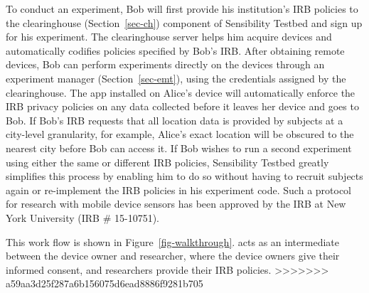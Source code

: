 To conduct an experiment, Bob will first provide his institution's 
IRB policies to the clearinghouse (Section~\ref{sec-ch}) component of Sensibility Testbed 
and sign up for his experiment. 
The clearinghouse server helps him acquire devices and automatically codifies 
policies specified by Bob's IRB. After obtaining remote devices, 
Bob can perform experiments directly on the devices through 
an experiment manager (Section~\ref{sec-emt}), using the 
credentials assigned by the clearinghouse. The app installed on Alice's device will 
automatically enforce the IRB privacy policies on any data collected before it leaves her device and 
goes to Bob. If Bob's IRB requests that all location data is provided by subjects at 
a city-level granularity, for example, Alice's exact location will be obscured 
to the nearest city before Bob can access it. 
If Bob wishes to run a
second experiment using either the same or different IRB policies, Sensibility Testbed 
greatly simplifies this process by enabling 
him to do so without having to recruit subjects again or re-implement the 
IRB policies in his experiment code.
Such a 
protocol for research with mobile device sensors has been approved by
the IRB at New York University (IRB \# 15-10751). 

This work flow is shown in Figure~\ref{fig-walkthrough}.  \sysname
acts as an intermediate between the device owner and researcher, 
where the device owners give their informed consent, and researchers
provide their IRB policies. 
>>>>>>> a59aa3d25f287a6b156075d6ead8886f9281b705



